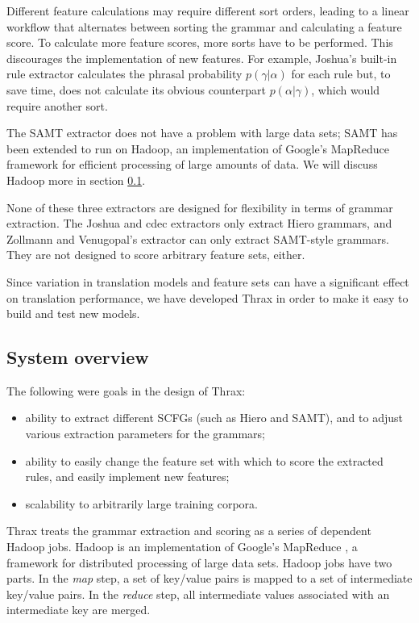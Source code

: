 \documentclass[11pt]{article}
\begin{document}
Different feature calculations may require different sort orders, leading to a linear workflow that alternates between sorting the grammar and calculating a feature score. To calculate more feature scores, more sorts have to be performed. This discourages the implementation of new features. For example, Joshua's built-in rule extractor calculates the phrasal probability $p(\gamma|\alpha)$ for each rule but, to save time, does not calculate its obvious counterpart $p(\alpha|\gamma)$, which would require another sort.

The SAMT extractor does not have a problem with large data sets; SAMT
has been extended \cite{venugopal2009hadoop} to run on Hadoop, an
implementation of Google's MapReduce framework for efficient
processing of large amounts of data.  We will discuss Hadoop more in
section \ref{design}.

None of these three extractors are designed for flexibility in terms of grammar extraction. The Joshua and cdec extractors only extract Hiero grammars, and Zollmann and Venugopal's extractor can only extract SAMT-style grammars. They are not designed to score arbitrary feature sets, either.

Since variation in translation models and feature sets can have a significant effect on translation performance, we have developed Thrax in order to make it easy to build and test new models. 

\subsection{System overview}
\label{design}

The following were goals in the design of Thrax:

\begin{itemize}
\item ability to extract different SCFGs (such as Hiero and SAMT), and to adjust various extraction parameters for the grammars;
\item ability to easily change the feature set with which to score the extracted rules, and easily implement new features;
\item scalability to arbitrarily large training corpora.
\end{itemize}

Thrax treats the grammar extraction and scoring as a series of dependent Hadoop jobs. Hadoop is an implementation of Google's MapReduce \cite{mapreduce}, a framework for distributed processing of large data sets. Hadoop jobs have two parts. In the {\em map} step, a set of key/value pairs is mapped to a set of intermediate key/value pairs. In the {\em reduce} step, all intermediate values associated with an intermediate key are merged.
\end{document}
